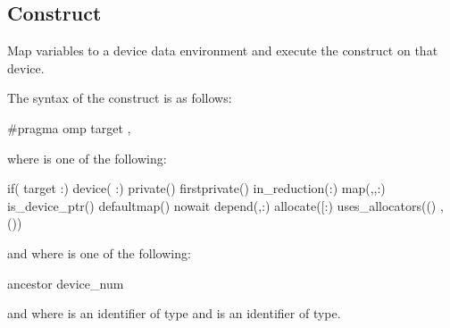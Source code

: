 \subsection{ Construct}
\label{subsec:target Construct}
\summary
Map variables to a device data environment and execute the construct on that device.

\syntax
\begin{ccppspecific}
The syntax of the  construct is as follows:

\begin{ompcPragma}
#pragma omp target \plc{[clause[ [},\plc{] clause] ... ] new-line}
\end{ompcPragma}

where  is one of the following:

\begin{indentedcodelist}
if(\plc{[} target :\plc{] scalar-expression})
device(\plc{[ device-modifier} :\plc{] integer-expression})
private()
firstprivate()
in_reduction(:)
map(\plc{[[map-type-modifier[},\plc{] [map-type-modifier[},\plc{] ...] map-type}:\plc{ ] locator-list})
is_device_ptr()
defaultmap()
nowait
depend(\plc{[depend-modifier},\plc{] dependence-type }:)
allocate([\plc{[allocator }:\plc{] list})
uses_allocators(\plc{allocator[}()\plc{]}
	       \plc{[},\plc{allocator[}()\plc{] ...]})
\end{indentedcodelist}

and where  is one of the following:
\begin{indentedcodelist}
ancestor
device_num
\end{indentedcodelist}

and where  is an identifier of  type
and  is an identifier of 
 type.
\end{ccppspecific}

